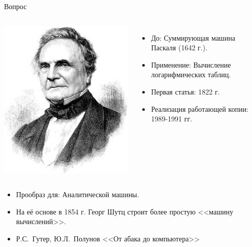 \documentclass[pdf,9pt,aspectratio=169]{beamer}
\begin{document}
\begin{frame}{Вопрос}
\begin{columns}[c]
\begin{column}[]{0.55\textwidth}
\begin{exampleblock}
\begin{columns}[]
            \includegraphics[width=\textwidth]{images/CharlesBabbage.jpg}
          \column{5.7cm}
              \setlength{\leftmargini}{5pt}
            \begin{itemize}
              \item До: Суммирующая машина Паскаля (1642 г.).
              \item Применение: Вычисление логарифмических таблиц.
              \item Первая статья: 1822 г.
              \item Реализация работающей копии: 1989-1991 гг.
            \end{itemize}
        \end{columns}
        \begin{itemize}
          \item Прообраз для: Аналитической машины.
          \item На её основе в 1854 г. Георг Шутц строит более простую <<машину вычислений>>.
          \item Р.С.~Гутер, Ю.Л.~Полунов <<От абака до компьютера>>
        \end{itemize}
      \end{exampleblock}
    \end{column}
  \end{columns}
\end{frame}
\end{document}
